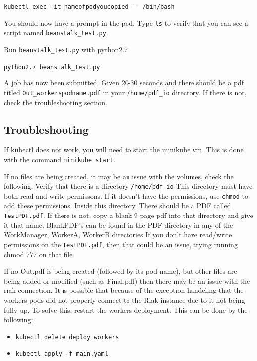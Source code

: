 \documentclass[onecolumn, draftclsnofoot,10pt, compsoc]{IEEEtran}
\begin{document}
\texttt{kubectl\ exec\ -it\ nameofpodyoucopied\ -\/-\ /bin/bash}

You should now have a prompt in the pod. Type \texttt{ls} to verify that
you can see a script named \texttt{beanstalk\_test.py}.

Run \texttt{beanstalk\_test.py} with python2.7

\texttt{python2.7\ beanstalk\_test.py}

A job has now been submitted. Given 20-30 seconds and there should be a
pdf titled \texttt{Out\_workerspodname.pdf} in your
\texttt{/home/pdf\_io} directory. If there is not, check the
troubleshooting section.

\subsection{Troubleshooting}\label{troubleshooting}

If kubectl does not work, you will need to start the minikube vm. This
is done with the command \texttt{minikube\ start}.

If no files are being created, it may be an issue with the volumes,
check the following. Verify that there is a directory
\texttt{/home/pdf\_io} This directory must have both read and write
permissons. If it doesn't have the permissions, use \texttt{chmod} to
add these permissions. Inside this directory. There should be a PDF
called \texttt{TestPDF.pdf}. If there is not, copy a blank 9 page pdf
into that directory and give it that name. BlankPDF's can be found in
the PDF directory in any of the WorkManager, WorkerA, WorkerB
directories If you don't have read/write permissions on the
\texttt{TestPDF.pdf}, then that could be an issue, trying running chmod
777 on that file

If no Out.pdf is being created (followed by its pod name), but other
files are being added or modified (such as Final.pdf) then there may be
an issue with the riak connection. It is possible that because of the
exception handeling that the workers pods did not properly connect to
the Riak instance due to it not being fully up. To solve this, restart
the workers deployment. This can be done by the following:

\begin{itemize}
\item
  \texttt{kubectl\ delete\ deploy\ workers}
\item
  \texttt{kubectl\ apply\ -f\ main.yaml}
\end{itemize}
\end{document}
